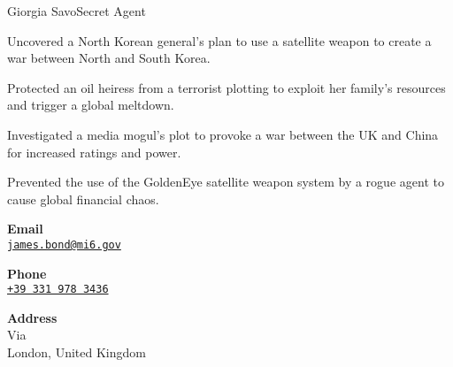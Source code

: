\documentclass{article}
\begin{document}
\begin{cv}[avatar]{Giorgia Savo}{Secret Agent}

\begin{cvevent}[2002]
    Uncovered a North Korean general's plan to use a satellite weapon to create a war between North and South Korea.
\end{cvevent}

\cvseparator[2]
\begin{cvevent}[1999]
    Protected an oil heiress from a terrorist plotting to exploit her family's resources and trigger a global meltdown.
\end{cvevent}

\cvseparator[2]
\begin{cvevent}[1997]
    Investigated a media mogul's plot to provoke a war between the UK and China for increased ratings and power.
\end{cvevent}

\cvseparator[2]
\begin{cvevent}[1995]
    Prevented the use of the GoldenEye satellite weapon system by a rogue agent to cause global financial chaos.
\end{cvevent}


\cvsidebar %



\begin{cvitem}[Envelope][4]
    \textbf{Email}\\
    \href{mailto:}{\texttt{james.bond@mi6.gov}}
\end{cvitem}

\cvseparator[3]
\begin{cvitem}[Phone][4]
    \textbf{Phone}\\
    \href{tel:+393319783436}{\texttt{+39 331 978 3436}}
\end{cvitem}

\cvseparator[3]
\begin{cvitem}[Home][4]
    \textbf{Address}\\
    Via\\ London, United Kingdom
\end{cvitem}



\end{cv}
\end{document}
